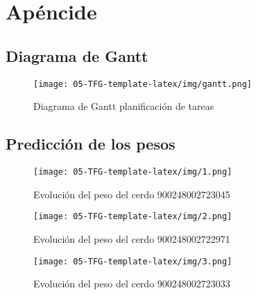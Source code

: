 ﻿\documentclass[10pt,a4paper,twocolumn,twoside]{article}
\begin{document}
\onecolumn
\appendix

\section*{Apéncide}

\setcounter{section}{1}

\subsection{Diagrama de Gantt}
\label{gant}

\begin{figure}[!htb]
\centering
\texttt{[image: 05-TFG-template-latex/img/gantt.png]}
\caption{Diagrama de Gantt planificación de tareas}
\label{g}

\end{figure}

\subsection{Predicción de los pesos}
\label{a3}


\begin{figure}[!htb]
\centering
\texttt{[image: 05-TFG-template-latex/img/1.png]}
\caption{Evolución del peso del cerdo 900248002723045}
\label{g}
\end{figure}

\begin{figure}[!htb]
\centering
\texttt{[image: 05-TFG-template-latex/img/2.png]}
\caption{Evolución del peso del cerdo 900248002722971}
\label{g}
\end{figure}

\begin{figure}[!htb]
\centering
\texttt{[image: 05-TFG-template-latex/img/3.png]}
\caption{Evolución del peso del cerdo 900248002723033}
\label{g}
\end{figure}
\end{document}
